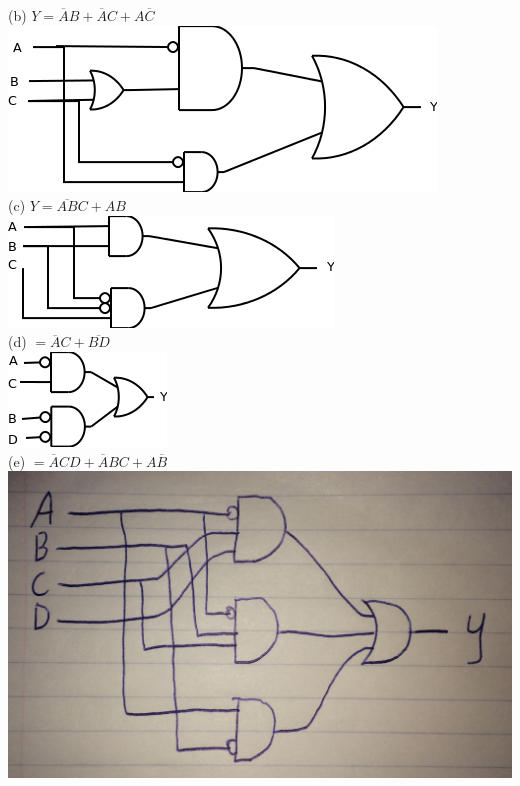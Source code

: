 \documentclass[12pt,a4paper]{report}
\newcommand*{\al}{\overline{A}}
\newcommand*{\bl}{\overline{B}}
\newcommand*{\cl}{\overline{C}}
\begin{document}
\begin{normalsize}
(b) $ Y = \al{}B + \al{}C + A\cl{} $ \\
\includegraphics[scale=1]{2_8B} \\

(c) $ Y = \overline{AB}C + AB $ \\
\includegraphics[scale=1]{2_8C} \\

(d) $ = \al{}C + \overline{BD} $ \\
\includegraphics[scale=1]{2_8D} \\

(e) $ = \al{}CD + \al{}BC + A\bl{} $ \\
\includegraphics[scale=.15]{2_8E} \\


\end{normalsize}
\end{document}
